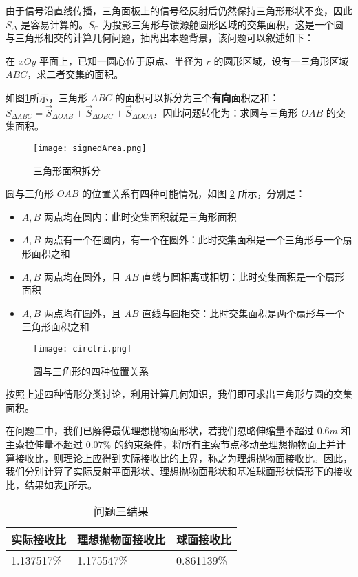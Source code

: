 \documentclass[withoutpreface,bwprint,fontset=macnew]{cumcmthesis} %
\begin{document}
		由于信号沿直线传播，三角面板上的信号经反射后仍然保持三角形形状不变，因此 $S_\Delta$ 是容易计算的。$S_\cap$ 为投影三角形与馈源舱圆形区域的交集面积，这是一个圆与三角形相交的计算几何问题，抽离出本题背景，该问题可以叙述如下：
		
		在 $xOy$ 平面上，已知一圆心位于原点、半径为 $r$ 的圆形区域，设有一三角形区域 $ABC$，求二者交集的面积。
		
		如图\ref{fig:signedArea}所示，三角形 $ABC$ 的面积可以拆分为三个\textbf{有向}面积之和：$S_{\Delta ABC}=\vec{S}_{\Delta OAB} + \vec{S}_{\Delta OBC} + \vec{S}_{\Delta OCA}$，因此问题转化为：求圆与三角形 $OAB$ 的交集面积。
		
		\begin{figure}[!h]
			\centering
			\texttt{[image: signedArea.png]} %
			\caption{三角形面积拆分}
			\label{fig:signedArea}
		\end{figure}
		
		圆与三角形 $OAB$ 的位置关系有四种可能情况，如图 \ref{fig:circtri} 所示，分别是：
		
		\begin{itemize}
			\item $A,B$ 两点均在圆内：此时交集面积就是三角形面积
			\item $A,B$ 两点有一个在圆内，有一个在圆外：此时交集面积是一个三角形与一个扇形面积之和
			\item $A,B$ 两点均在圆外，且 $AB$ 直线与圆相离或相切：此时交集面积是一个扇形面积
			\item $A,B$ 两点均在圆外，且 $AB$ 直线与圆相交：此时交集面积是两个扇形与一个三角形面积之和
		\end{itemize}
	
		
		\begin{figure}[!h]
			\centering
			\texttt{[image: circtri.png]} %
			\caption{圆与三角形的四种位置关系}
			\label{fig:circtri}
		\end{figure}
	
		按照上述四种情形分类讨论，利用计算几何知识，我们即可求出三角形与圆的交集面积。
	
		在问题二中，我们已解得最优理想抛物面形状，若我们忽略伸缩量不超过 $0.6m$ 和主索拉伸量不超过 $0.07\%$ 的约束条件，将所有主索节点移动至理想抛物面上并计算接收比，则理论上应得到实际接收比的上界，称之为理想抛物面接收比。因此，我们分别计算了实际反射平面形状、理想抛物面形状和基准球面形状情形下的接收比，结果如表\ref{tab:resultT3}所示。
		
		\begin{table}[!h]
			\centering
			\caption{问题三结果}
			\label{tab:resultT3}
			\begin{tabular}{|l|l|l|}
				\hline
				实际接收比 & 理想抛物面接收比 & 球面接收比 \\ \hline
				1.137517\% & 1.175547\% & 0.861139\% \\ \hline
			\end{tabular}
		\end{table}
\end{document}
